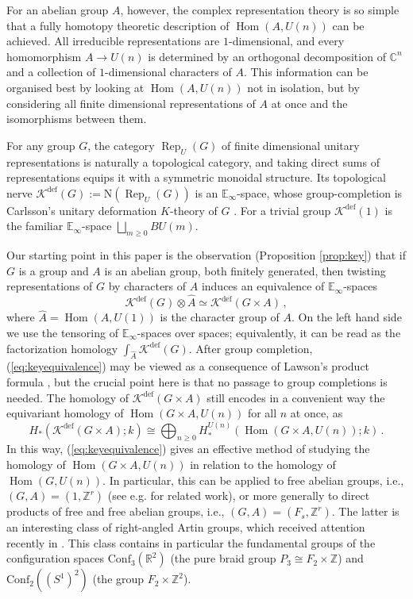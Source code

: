 \documentclass[oneside, a4paper, 12pt]{article}
\numberwithin{equation}{section}
\DeclareMathOperator{\Rep}{Rep}
\DeclareMathOperator{\Hom}{Hom}
\newcommand{\Kdef}{\mathcal{K}^{\mathrm{def}}}
\newcommand{\R}{\mathbb{R}}
\newcommand{\Z}{\mathbb{Z}}
\newcommand{\C}{\mathbb{C}}
\theoremstyle{plain}
\theoremstyle{definition}
\theoremstyle{remark}
\begin{document}
For an abelian group $A$, however, the complex representation theory is so simple that a fully homotopy theoretic description of $\Hom(A,U(n))$ can be achieved. All irreducible representations are $1$-dimensional, and every homomorphism $A\to U(n)$ is determined by an orthogonal decomposition of $\C^n$ and a collection of $1$-dimensional characters of $A$. This information can be organised best by looking at $\Hom(A,U(n))$ not in isolation, but by considering all finite dimensional representations of $A$ at once and the isomorphisms between them.

For any group $G$, the category $\Rep_U(G)$ of finite dimensional unitary representations is naturally a topological category, and taking direct sums of representations equips it with a symmetric monoidal structure. Its topological nerve $\Kdef(G):=\mathrm{N}(\Rep_U(G))$ is an $\mathbb{E}_\infty$-space, whose group-completion is Carlsson's unitary deformation $K$-theory of $G$ \cite{Carlsson, Lawson, RThesis}. For a trivial group $\Kdef(1)$ is the familiar $\mathbb{E}_\infty$-space $\bigsqcup_{m\geq 0} BU(m)$.

Our starting point in this paper is the observation (Proposition \ref{prop:key}) that if $G$ is a group and $A$ is an abelian group, both finitely generated, then twisting representations of $G$ by characters of $A$ induces an equivalence of $\mathbb{E}_\infty$-spaces
\begin{equation} \label{eq:keyequivalence}
\Kdef(G) \otimes \widehat{A} \simeq \Kdef(G \times A)\,,
\end{equation}
where $\widehat{A}=\Hom(A,U(1))$ is the character group of $A$. On the left hand side we use the tensoring of $\mathbb{E}_\infty$-spaces over spaces; equivalently, it can be read as the factorization homology $\int_{\widehat{A}} \Kdef(G)$. After group completion, (\ref{eq:keyequivalence}) may be viewed as a consequence of Lawson's product formula \cite{Lawson}, but the crucial point here is that no passage to group completions is needed. The homology of $\Kdef(G\times A)$ still encodes in a convenient way the equivariant homology of $\Hom(G\times A,U(n))$ for all $n$ at once, as
\[
H_\ast(\Kdef(G\times A);k) \cong \bigoplus_{n\geq 0} H^{U(n)}_\ast(\Hom(G\times A,U(n));k)\,.
\]
In this way, (\ref{eq:keyequivalence}) gives an effective method of studying the homology of $\Hom(G\times A,U(n))$ in relation to the homology of $\Hom(G,U(n))$. In particular, this can be applied to free abelian groups, i.e.,  $(G,A)=(1,\Z^r)$ (see e.g. \cite{AC,AG,KT21,Stafa} for related work), or more generally to direct products of free and free abelian groups, i.e., $(G,A)=(F_s,\Z^r)$. The latter is an interesting class of right-angled Artin groups, which received attention recently in \cite{Florentino2}. This class contains in particular the fundamental groups of the configuration spaces $\mathrm{Conf}_3(\R^2)$ (the pure braid group $P_3\cong F_2\times \Z$) and $\mathrm{Conf}_2((S^1)^2)$ (the group $F_2\times \Z^2$).
\end{document}
